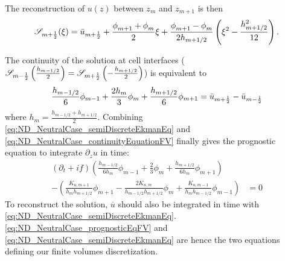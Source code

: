 The reconstruction of $u(z)$ between $z_m$ and $z_{m+1}$
is then
\begin{equation}
\label{eq:ND_NeutralCase_quadraticReconstruction}
{\cal S}_{m+\frac{1}{2}}(\xi) =
	\Bar{u}_{m+\frac{1}{2}} + 
	\frac{\phi_{m+1}^{} + \phi_{m}^{}}{2} \xi
	+ \frac{\phi_{m+1}^{} - \phi_{m}^{}}{2h_{m+1/2}}
	\left(\xi^2 - \frac{h_{m+1/2}^2}{12}\right).
\end{equation}

The continuity of the solution at cell interfaces (${\cal S}_{m-\frac{1}{2}}\left(\frac{h_{m-1/2}}{2}\right) = {\cal S}_{m+\frac{1}{2}}\left(-\frac{h_{m+1/2}}{2}\right)$) is equivalent to
%
\begin{equation}
\label{eq:ND_NeutralCase_continuityEquationFV}
\frac{h_{m-1/2}}{6} \phi_{m-1} 
+ \frac{2h_{m}}{3} \phi_m  
+ \frac{h_{m+1/2}}{6} \phi_{m+1} = \Bar{u}_{m+\frac{1}{2}} - \Bar{u}_{m-\frac{1}{2}}
\end{equation}
where $h_m = \frac{h_{m-1/2} + h_{m+1/2}}{2}$.
Combining \eqref{eq:ND_NeutralCase_semiDiscreteEkmanEq}
and \eqref{eq:ND_NeutralCase_continuityEquationFV} finally gives
the prognostic equation to integrate
$\partial_z u$ in time:
\begin{equation}
\begin{aligned}
\label{eq:ND_NeutralCase_prognosticEqFV}
(\partial_t + if) \left( \frac{h_{m-1/2}}{6h_m} \phi_{m-1} 
+ \frac{2}{3} \phi_m  
+ \frac{h_{m+1/2}}{6h_m} \phi_{m+1} \right)& \\
-
    \left(
	\frac{K_{u, m+1}}{h_m h_{m+1/2}}\phi_{m+1} - \frac{2 K_{u,m}}{h_{m-1/2} h _{m+1/2}}\phi_m + \frac{K_{u,m-1}}{h_m h_{m-1/2}}\phi_{m-1}
    \right)
&= 0
\end{aligned}
\end{equation}
To reconstruct the solution, $\overline{u}$ should also be 
integrated in time with \eqref{eq:ND_NeutralCase_semiDiscreteEkmanEq}.
\eqref{eq:ND_NeutralCase_prognosticEqFV} and
\eqref{eq:ND_NeutralCase_semiDiscreteEkmanEq} are hence the two 
equations defining our finite volumes discretization.

